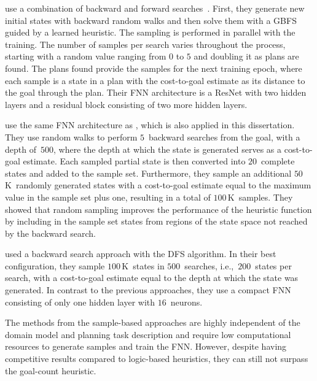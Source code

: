 \citet{ferber2022neural} use a combination of backward and forward searches~\cite{arfaee2011learning}. First, they generate new initial states with backward random walks and then solve them with a GBFS guided by a learned heuristic. The sampling is performed in parallel with the training. The number of samples per search varies throughout the process, starting with a random value ranging from $0$ to $5$ and doubling it as plans are found. The plans found provide the samples for the next training epoch, where each sample is a state in a plan with the cost-to-goal estimate as its distance to the goal through the plan. Their FNN architecture is a ResNet with two hidden layers and a residual block consisting of two more hidden layers.

\citet{otoole2022sampling} use the same FNN architecture as \citet{ferber2022neural}, which is also applied in this dissertation. They use random walks to perform $5$~backward searches from the goal, with a depth of~$500$, where the depth at which the state is generated serves as a cost-to-goal estimate. Each sampled partial state is then converted into $20$~complete states and added to the sample set. Furthermore, they sample an additional $50$\,K~randomly generated states with a cost-to-goal estimate equal to the maximum value in the sample set plus one, resulting in a total of $100$\,K~samples. They showed that random sampling improves the performance of the heuristic function by including in the sample set states from regions of the state space not reached by the backward search.

\citet{yu2020learning} used a backward search approach with the DFS algorithm. In their best configuration, they sample $100$\,K~states in $500$~searches, i.e.,~$200$~states per search, with a cost-to-goal estimate equal to the depth at which the state was generated. In contrast to the previous approaches, they use a compact FNN consisting of only one hidden layer with $16$~neurons.

The methods from the sample-based approaches are highly independent of the domain model and planning task description and require low computational resources to generate samples and train the FNN. However, despite having competitive results compared to logic-based heuristics, they can still not surpass the goal-count heuristic.

